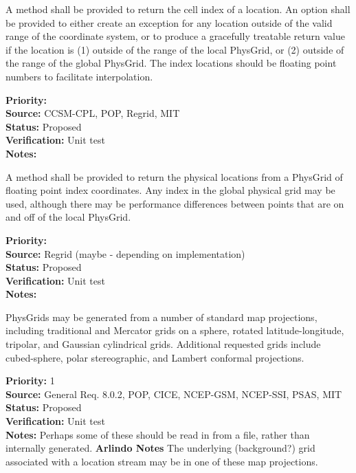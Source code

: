 A method shall be provided to return the cell index of a location.  An option shall
be provided to either create an exception for any location outside of the valid
range of the coordinate system, or to produce a gracefully treatable return value if
the location is (1) outside of the range of the local PhysGrid, or (2) outside of the
range of the global PhysGrid.  The index locations should be floating point numbers to
facilitate interpolation.
\begin{reqlist}
{\bf Priority:} \\
{\bf Source:} CCSM-CPL, POP, Regrid, MIT \\
{\bf Status:} Proposed \\
{\bf Verification:} Unit test \\
{\bf Notes:} 
\end{reqlist}

A method shall be provided to return the physical locations from a PhysGrid of
floating point index coordinates.  Any index in the global physical grid may be
used, although there may be performance differences between points that are on
and off of the local PhysGrid.
\begin{reqlist}
{\bf Priority:} \\
{\bf Source:} Regrid (maybe - depending on implementation) \\
{\bf Status:} Proposed \\
{\bf Verification:} Unit test \\
{\bf Notes:} 
\end{reqlist}


PhysGrids may be generated from a number of standard map projections, including
traditional and Mercator grids on a sphere, rotated latitude-longitude,
tripolar, and Gaussian cylindrical grids.  Additional requested grids include 
cubed-sphere, polar stereographic, and Lambert conformal projections.
\begin{reqlist}
{\bf Priority:} 1 \\
{\bf Source:} General Req. 8.0.2, POP, CICE, NCEP-GSM, NCEP-SSI,
PSAS, MIT \\
{\bf Status:} Proposed \\
{\bf Verification:} Unit test\\
{\bf Notes:}  Perhaps some of these should be read in from a file, rather than
internally generated.
{\bf Arlindo Notes} The underlying (background?) grid associated with a location stream may be in one of these map projections.
\end{reqlist}

